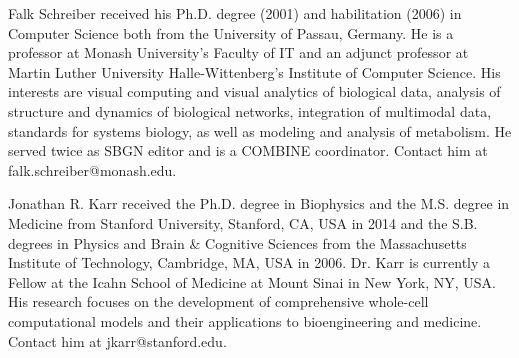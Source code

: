 \documentclass[journal,transmag]{IEEEtran}
\begin{document}
\begin{IEEEbiography}{Falk Schreiber} 
received his Ph.D. degree (2001) and habilitation (2006) in Computer Science both from the University of Passau, Germany. 
He is a professor at Monash University's Faculty of IT and an adjunct professor at Martin Luther University Halle-Wittenberg's Institute of Computer Science. 
His interests are visual computing and visual analytics of biological data, analysis of structure and dynamics of biological networks, integration of multimodal data, standards for systems biology, as well as modeling and analysis of metabolism. 
He served twice as SBGN editor and is a COMBINE coordinator.
Contact him at falk.schreiber@monash.edu.
\end{IEEEbiography}

\begin{IEEEbiography}{Jonathan R. Karr}
received the Ph.D. degree in Biophysics and the M.S. degree in Medicine from Stanford University, Stanford, CA, USA in 2014 and the S.B. degrees in Physics and Brain \& Cognitive Sciences from the Massachusetts Institute of Technology, Cambridge, MA, USA in 2006. 
Dr. Karr is currently a Fellow at the Icahn School of Medicine at Mount Sinai in New York, NY, USA. 
His research focuses on the development of comprehensive whole-cell computational models and their applications to bioengineering and medicine. 
Contact him at jkarr@stanford.edu.
\end{IEEEbiography}




\end{document}
